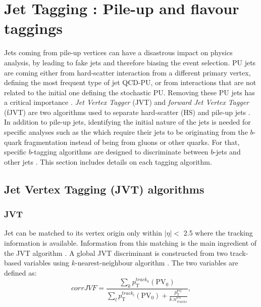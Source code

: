 \section{Jet Tagging : Pile-up and flavour taggings}
\label{Jet:Tag}
Jets coming from pile-up vertices can have a disastrous impact on physics analysis, by leading to fake jets and therefore biasing the event selection. PU jets are coming either from hard-scatter interaction from a different primary vertex, defining the most frequent type of jet QCD-PU, or from interactions that are not related to the initial one defining the stochastic PU. Removing these PU jets has a critical importance \cite{Tagging_2013, Tagging_2014}. \textit{Jet Vertex Tagger} (JVT) and \textit{forward Jet Vertex Tagger} (fJVT) are two algorithms used to separate hard-scatter (HS) and pile-up jets \cite{JVT_2014, fJVT}. In addition to pile-up jets, identifying the initial nature of the jets is needed for specific analyses such as the \HHyybb which require their jets to be originating from the $b$-quark fragmentation instead of being from gluons or other quarks. For that, specific $b$-tagging algorithms are designed to discriminate between $b$-jets and other jets \cite{Light_Quark_Tagger}. This section includes details on each tagging algorithm. 

\subsection{Jet Vertex Tagging (JVT) algorithms}
\label{Jet:Tag:JVT}

\subsubsection{JVT}
\label{Jet:Tag:JVT:JVT}
Jet can be matched to its vertex origin only within $|\eta|<$ 2.5 where the tracking information is available. Information from this matching is the main ingredient of the JVT algorithm \cite{JVT_Perf}. A global JVT discriminant is constructed from two track-based variables using $k$-nearest-neighbour algorithm \cite{kNN}. The two variables are defined as: 
\begin{equation}
    corrJVF=\frac{\sum_{k} p_{\mathrm{T}}^{ {track
    }_{k}}\left(\mathrm{PV}_{0}\right)}{\sum_{l} p_{\mathrm{T}}^{{track
    }_{l}}\left(\mathrm{PV}_{0}\right)+\frac{p_{\mathrm{T}}^{\mathrm{PU}}}{k . n_{\ {tracks }}^{\mathrm{PV}}}},
\end{equation}


